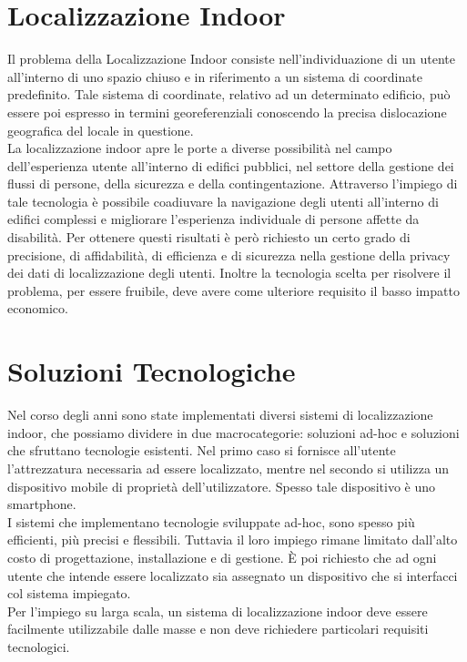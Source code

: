 \documentclass{standalone}
\begin{document}
\section{Localizzazione Indoor}
Il problema della Localizzazione Indoor consiste nell'individuazione di un
utente all'interno di uno spazio chiuso e in riferimento a un sistema di
coordinate predefinito. Tale sistema di coordinate, relativo ad un determinato
edificio, può essere poi espresso in termini georeferenziali conoscendo la
precisa dislocazione geografica del locale in questione. \\
La localizzazione indoor apre le porte a diverse possibilità nel campo
dell'esperienza utente all'interno di edifici pubblici, nel settore
della gestione dei flussi di persone, della sicurezza e della contingentazione.
Attraverso l'impiego di tale tecnologia è possibile coadiuvare la navigazione
degli utenti all'interno di edifici complessi e migliorare l'esperienza
individuale di persone affette da disabilità. Per ottenere questi risultati è
però richiesto un certo grado di precisione, di affidabilità, di efficienza e
di sicurezza nella gestione della privacy dei dati di localizzazione degli
utenti. Inoltre la tecnologia scelta per risolvere il problema, per essere
fruibile, deve avere come ulteriore requisito il basso impatto economico.

\section{Soluzioni Tecnologiche}
Nel corso degli anni sono state implementati diversi sistemi di
localizzazione indoor, che possiamo dividere in due macrocategorie: soluzioni
ad-hoc e soluzioni che sfruttano tecnologie esistenti. Nel primo caso si
fornisce all'utente l'attrezzatura necessaria ad essere localizzato, mentre nel
secondo si utilizza un dispositivo mobile di proprietà dell'utilizzatore.
Spesso tale dispositivo è uno smartphone. \\ I sistemi che implementano
tecnologie sviluppate ad-hoc, sono spesso più efficienti, più precisi e
flessibili. Tuttavia il loro impiego rimane limitato dall'alto costo di
progettazione, installazione e di gestione. È poi richiesto che ad ogni utente
che intende essere localizzato sia assegnato un dispositivo che si interfacci
col sistema impiegato. \\
Per l'impiego su larga scala, un sistema di localizzazione indoor deve essere
facilmente utilizzabile dalle masse e non deve richiedere particolari requisiti
tecnologici.  \\
\end{document}
